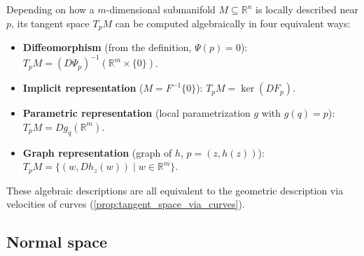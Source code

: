 \begin{remark}
\label{rem:four_representations_tangent_space}
Depending on how a $m$-dimensional submanifold $M \subseteq \mathbb{R}^n$ is locally described near $p$, its tangent space $T_pM$ can be computed algebraically in four equivalent ways:
\begin{itemize}
  \item \textbf{Diffeomorphism} (from the definition, $\Psi(p)=0$): $T_pM = (D\Psi_p)^{-1}(\mathbb{R}^m \times \{0\})$.
  \item \textbf{Implicit representation} ($M = F^{-1}\{0\}$): $T_pM = \ker(DF_p)$.
  \item \textbf{Parametric representation} (local parametrization $g$ with $g(q)=p$): $T_pM = Dg_q(\mathbb{R}^m)$.
  \item \textbf{Graph representation} (graph of $h$, $p=(z, h(z))$): $T_pM = \{(w, Dh_z(w)) \mid w \in \mathbb{R}^m\}$.
\end{itemize}
These algebraic descriptions are all equivalent to the geometric description via velocities of curves (\cref{prop:tangent_space_via_curves}).
\end{remark}

\subsection{Normal space}

